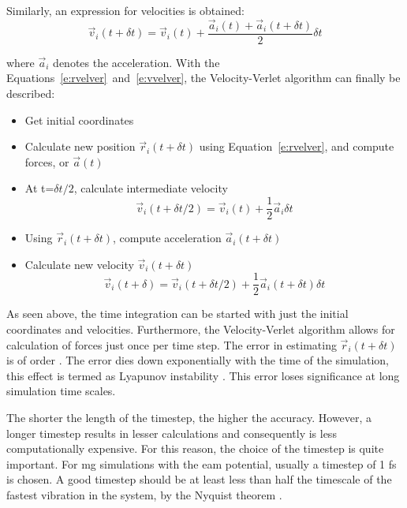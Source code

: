 Similarly, an expression for velocities is obtained:
\begin{equation} \label{e:vvelver}
\vec{v}_i(t+\delta t) = \vec{v}_i(t) + \frac{\vec{a}_i(t) + \vec{a}_i(t+\delta t)}{2}\delta t
\end{equation}

where $\vec{a}_i$ denotes the acceleration. With the Equations~\ref{e:rvelver}~and~\ref{e:vvelver}, the Velocity-Verlet algorithm can finally be described:

\begin{itemize}[noitemsep]
\item Get initial coordinates
\item Calculate new position $\vec{r}_i(t+\delta t)$ using Equation~\ref{e:rvelver}, and compute forces, or $\vec{a}(t)$
\item At t=$\delta t/2$, calculate intermediate velocity \begin{equation} \vec{v}_i(t+\delta t/2) = \vec{v}_i(t) + \frac{1}{2}\vec{a}_i \delta t \end{equation}
\item Using $\vec{r}_i(t+\delta t)$, compute acceleration $\vec{a}_i(t+\delta t)$
\item Calculate new velocity $\vec{v}_i(t+\delta t)$ \begin{equation} \vec{v}_i(t+\delta) = \vec{v}_i(t+\delta t/2) + \frac{1}{2}\vec{a}_i(t+\delta t) \delta t \end{equation}
\end{itemize}

As seen above, the time integration can be started with just the initial coordinates and velocities. Furthermore, the Velocity-Verlet algorithm allows for calculation of forces just once per time step. The error in estimating $\vec{r}_i(t+\delta t)$ is of order . The error dies down exponentially with the time of the simulation, this effect is termed as Lyapunov instability \cite{Frenkel1997}. This error loses significance at long simulation time scales. \par

The shorter the length of the timestep, the higher the accuracy. However, a longer timestep results in lesser calculations and consequently is less computationally expensive. For this reason, the choice of the timestep is quite important. For \gls{mg} simulations with the \gls{eam} potential, usually a timestep of 1 \gls{fs} is chosen. A good timestep should be at least less than half the timescale of the fastest vibration in the system, by the Nyquist theorem \cite{Shannon1949}.


